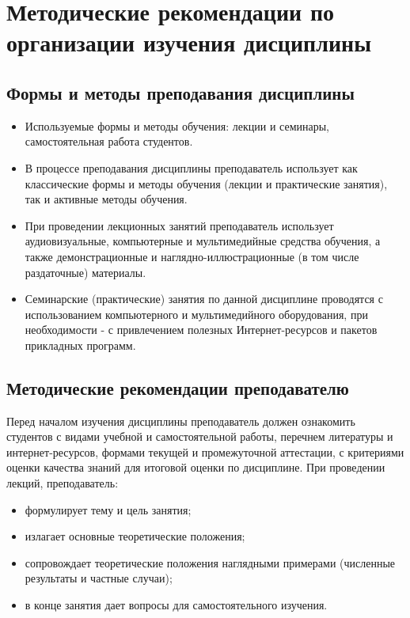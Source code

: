 \documentclass[a4paper, 12pt]{article}
\begin{document}
\section{Методические рекомендации по организации изучения дисциплины}

\subsection{Формы и методы преподавания дисциплины}

\begin{itemize}
    \item Используемые формы и методы обучения: лекции и семинары, самостоятельная работа студентов.
    \item В процессе преподавания дисциплины преподаватель использует как классические формы и методы обучения (лекции и практические занятия), так и активные методы обучения. 
    \item При проведении лекционных занятий преподаватель использует аудиовизуальные, компьютерные и мультимедийные средства обучения, а также демонстрационные и наглядно-иллюстрационные (в том числе раздаточные) материалы.
    \item Семинарские (практические) занятия по данной дисциплине проводятся с использованием компьютерного и мультимедийного оборудования, при необходимости - с привлечением полезных Интернет-ресурсов и пакетов прикладных программ. 
\end{itemize}

\subsection{Методические рекомендации преподавателю}

Перед началом изучения дисциплины преподаватель должен ознакомить студентов с видами учебной и самостоятельной работы, перечнем литературы и интернет-ресурсов, формами текущей и промежуточной аттестации, с критериями оценки качества знаний для итоговой оценки по дисциплине. 
При проведении лекций, преподаватель:
\begin{itemize}[noitemsep,topsep=0pt]
    \item формулирует тему и цель занятия;
    \item излагает основные теоретические положения;
    \item сопровождает теоретические положения наглядными примерами (численные результаты и частные случаи);
    \item в конце занятия дает вопросы для самостоятельного изучения.
\end{itemize}
\end{document}
